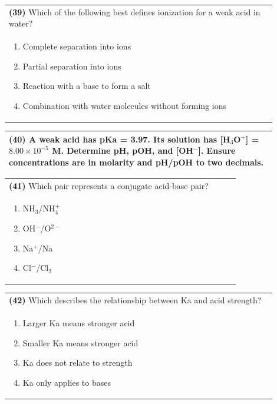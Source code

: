 \documentclass{article}
\begin{document}
\noindent\begin{tabular}{|p{0.9\linewidth}|}
\hline
\textbf{(39)} Which of the following best defines ionization for a weak acid in water? \\[0.2cm]
\begin{minipage}[t]{0.85\linewidth}
\begin{enumerate}[label=\alph*.]
\item Complete separation into ions \item Partial separation into ions \item Reaction with a base to form a salt \item Combination with water molecules without forming ions
\end{enumerate}
\end{minipage}\\[0.2cm]
\hline
\end{tabular}

\noindent\begin{tabular}{|p{0.9\linewidth}|}
\hline
\textbf{(40)} A weak acid has pKa = 3.97. Its solution has [H$_3$O$^+$] = $8.00\times10^{-5}$ M. Determine pH, pOH, and [OH$^-$].  Ensure concentrations are in molarity and pH/pOH to two decimals.\\[4cm]
\hline
\end{tabular}
\newpage

\noindent\begin{tabular}{|p{0.9\linewidth}|}
\hline
\textbf{(41)} Which pair represents a conjugate acid-base pair?\\[0.2cm]
\begin{minipage}[t]{0.85\linewidth}
\begin{enumerate}[label=\alph*.]
\item NH$_3$/NH$_4^+$
\item OH$^-$/O$^{2-}$
\item Na$^+$/Na
\item Cl$^-$/Cl$_2$
\end{enumerate}
\end{minipage}\\[0.2cm]
\hline
\end{tabular}

\noindent\begin{tabular}{|p{0.9\linewidth}|}
\hline
\textbf{(42)} Which describes the relationship between Ka and acid strength? \\[0.2cm]
\begin{minipage}{0.85\linewidth}
\begin{enumerate}[label=\alph*.]
\item Larger Ka means stronger acid \item Smaller Ka means stronger acid \item Ka does not relate to strength \item Ka only applies to bases
\end{enumerate}
\end{minipage}\\[0.2cm]
\hline
\end{tabular}
\end{document}
